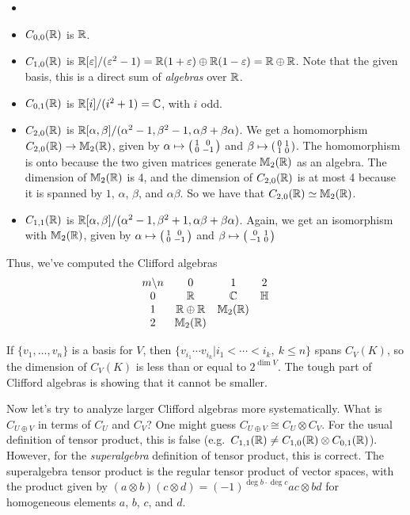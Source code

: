  \begin{example}
   \begin{itemize}
   \item[]
   \item $C_{0,0}(\mathbb{R})$ is $\mathbb{R}$.

   \item $C_{1,0}(\mathbb{R})$ is $\mathbb{R}[\varepsilon]/(\varepsilon^2-1) = \mathbb{R}(1+\varepsilon)\oplus \mathbb{R}(1-\varepsilon) = \mathbb{R}\oplus
   \mathbb{R}$. Note that the given basis, this is a direct sum of \emph{algebras} over $\mathbb{R}$.

   \item $C_{0,1}(\mathbb{R})$ is $\mathbb{R}[i]/(i^2+1)=\mathbb{C}$, with $i$ odd.\\

   \item $C_{2,0}(\mathbb{R})$ is
   $\mathbb{R}[\alpha,\beta]/(\alpha^2-1,\beta^2-1,\alpha\beta+\beta\alpha)$. We get a
   homomorphism $C_{2,0}(\mathbb{R})\to \mathbb{M}_2(\mathbb{R})$, given by $\alpha \mapsto \left( \begin{smallmatrix} 1 & 0 \\ 0 & -1 \end{smallmatrix} \right)$
   and $\beta \mapsto \left( \begin{smallmatrix} 0 & 1 \\ 1 & 0 \end{smallmatrix} \right)$. The homomorphism is onto because the two given
   matrices generate $\mathbb{M}_2(\mathbb{R})$ as an algebra. The dimension of $\mathbb{M}_2(\mathbb{R})$ is 4, and
   the dimension of $C_{2,0}(\mathbb{R})$ is at most 4 because it is spanned by $1$, $\alpha$,
   $\beta$, and $\alpha\beta$. So we have that $C_{2,0}(\mathbb{R})\simeq \mathbb{M}_2(\mathbb{R})$.

   \item $C_{1,1}(\mathbb{R})$ is
   $\mathbb{R}[\alpha,\beta]/(\alpha^2-1,\beta^2+1,\alpha\beta+\beta\alpha)$. Again, we get an
   isomorphism with $\mathbb{M}_2(\mathbb{R})$, given by $\alpha\mapsto \left( \begin{smallmatrix} 1 & 0 \\ 0 & -1 \end{smallmatrix} \right)$ and
   $\beta\mapsto\left( \begin{smallmatrix} 0 & 1 \\ -1 & 0 \end{smallmatrix} \right)$
   \end{itemize}
   Thus, we've computed the Clifford algebras
   \[\begin{array}{cccccc}
    m\backslash n  & 0 & 1 & 2 \\
   0 & \mathbb{R} & \mathbb{C} & \mathbb{H} \\
   1 & \mathbb{R}\oplus \mathbb{R} & \mathbb{M}_2(\mathbb{R}) \\
   2 & \mathbb{M}_2(\mathbb{R})
   \end{array}\]
 \end{example}
 \begin{remark}
   If $\{v_1,\dots, v_n\}$ is a basis for $V$, then $\{v_{i_1}\cdots v_{i_k}|i_1<\cdots
   <i_k,\ k\le n\}$ spans $C_V(K)$, so the dimension of $C_V(K)$ is less than or equal to
   $2^{\dim V}$. The tough part of Clifford algebras is showing that it cannot be smaller.
 \end{remark}

 Now let's try to analyze larger Clifford algebras more systematically. What is
 $C_{U\oplus V}$ in terms of $C_U$ and $C_V$? One might guess $C_{U\oplus V} \cong
 C_U\otimes C_V$. For the usual definition of tensor product, this is false (e.g.\
 $C_{1,1}(\mathbb{R}) \neq C_{1,0}(\mathbb{R})\otimes C_{0,1}(\mathbb{R})$). However, for the
 \emph{superalgebra} definition of tensor product, this is correct. The superalgebra
 tensor product is the regular tensor product of vector spaces, with the product given by
 $(a\otimes b)(c\otimes d) = (-1)^{\deg b\cdot \deg c} ac\otimes bd$ for homogeneous
 elements $a$, $b$, $c$, and $d$.

